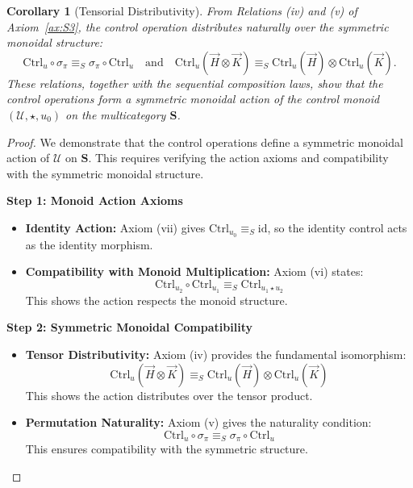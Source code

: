 \documentclass[11pt]{article}
\newtheorem{corollary}{Corollary}
\begin{document}
\begin{corollary}[Tensorial Distributivity]\label{cor:tensorial-distributivity}
From Relations (iv) and (v) of Axiom~\ref{ax:S3}, the control operation distributes naturally over the symmetric monoidal structure:
\[
\mathrm{Ctrl}_u \circ \sigma_{\pi} \equiv_S \sigma_{\pi} \circ \mathrm{Ctrl}_u \quad \text{and} \quad \mathrm{Ctrl}_u(\vec{H} \otimes \vec{K}) \equiv_S \mathrm{Ctrl}_u(\vec{H}) \otimes \mathrm{Ctrl}_u(\vec{K}).
\]
These relations, together with the sequential composition laws, show that the control operations form a \emph{symmetric monoidal action} of the control monoid $(\mathcal{U}, \star, u_0)$ on the multicategory $\mathbf{S}$.
\end{corollary}

\begin{proof}
We demonstrate that the control operations define a symmetric monoidal action of $\mathcal{U}$ on $\mathbf{S}$. This requires verifying the action axioms and compatibility with the symmetric monoidal structure.

\noindent\textbf{Step 1: Monoid Action Axioms}

\begin{itemize}
    \item \textbf{Identity Action:} Axiom (vii) gives $\mathrm{Ctrl}_{u_0} \equiv_S \mathrm{id}$, so the identity control acts as the identity morphism.
    
    \item \textbf{Compatibility with Monoid Multiplication:} Axiom (vi) states:
    \[
    \mathrm{Ctrl}_{u_2} \circ \mathrm{Ctrl}_{u_1} \equiv_S \mathrm{Ctrl}_{u_1 \star u_2}
    \]
    This shows the action respects the monoid structure.
\end{itemize}

\noindent\textbf{Step 2: Symmetric Monoidal Compatibility}

\begin{itemize}
    \item \textbf{Tensor Distributivity:} Axiom (iv) provides the fundamental isomorphism:
    \[
    \mathrm{Ctrl}_u(\vec{H} \otimes \vec{K}) \equiv_S \mathrm{Ctrl}_u(\vec{H}) \otimes \mathrm{Ctrl}_u(\vec{K})
    \]
    This shows the action distributes over the tensor product.
    
    \item \textbf{Permutation Naturality:} Axiom (v) gives the naturality condition:
    \[
    \mathrm{Ctrl}_u \circ \sigma_{\pi} \equiv_S \sigma_{\pi} \circ \mathrm{Ctrl}_u
    \]
    This ensures compatibility with the symmetric structure.
\end{itemize}


\end{proof}
\end{document}
